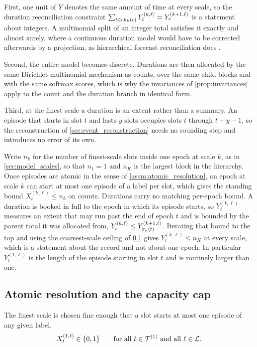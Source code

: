 First, one unit of $Y$ denotes the same amount of time at every scale, so the
duration reconciliation constraint
$\sum_{t \in \operatorname{ch}_k(c)} Y_t^{(k,\ell)} = Y_c^{(k+1,\ell)}$
is a statement about integers. A multinomial split of an integer total
satisfies it exactly and almost surely, where a continuous duration model would
have to be corrected afterwards by a projection, as hierarchical forecast
reconciliation does \citep{wickramasuriya2019mint}.

Second, the entire model becomes discrete. Durations are then allocated by the
same Dirichlet-multinomial mechanism as counts, over the same child blocks and
with the same softmax scores, which is why the invariances of
\cref{prop:invariances} apply to the count and the duration branch in identical
form.

Third, at the finest scale a duration is an extent rather than a summary. An
episode that starts in slot $t$ and lasts $y$ slots occupies slots $t$ through
$t + y - 1$, so the reconstruction of \cref{sec:event_reconstruction} needs no
rounding step and introduces no error of its own.

Write $n_k$ for the number of finest-scale slots inside one epoch at scale $k$,
as in \cref{sec:model_scales}, so that $n_1 = 1$ and $n_K$ is the largest block
in the hierarchy. Once episodes are atomic in the sense of
\cref{assm:atomic_resolution}, an epoch at scale $k$ can start at most one
episode of a label per slot, which gives the standing bound
$X_t^{(k,\ell)} \le n_k$ on counts. Durations carry no matching per-epoch
bound. A duration is booked in full to the epoch in which its episode starts,
so $Y_t^{(k,\ell)}$ measures an extent that may run past the end of epoch $t$
and is bounded by the parent total it was allocated from,
$Y_t^{(k,\ell)} \le Y_{\pi_k(t)}^{(k+1,\ell)}$. Iterating that bound to the
top and using the coarsest-scale ceiling of \cref{sec:atomic_resolution} gives
$Y_t^{(k,\ell)} \le n_K$ at every scale, which is a statement about the record
and not about one epoch. In particular $Y_t^{(1,\ell)}$ is the length of the
episode starting in slot $t$ and is routinely larger than one.

\subsection{Atomic resolution and the capacity cap}
\label{sec:atomic_resolution}

\begin{assumption}
\label{assm:atomic_resolution}
The finest scale is chosen fine enough that a slot starts at most one episode
of any given label,
\[
X_t^{(1,\ell)} \in \{0,1\}
\qquad
\text{for all } t \in {\mathcal{T}}^{(1)} \text{ and all } \ell \in {\mathcal{L}} .
\]
\end{assumption}

